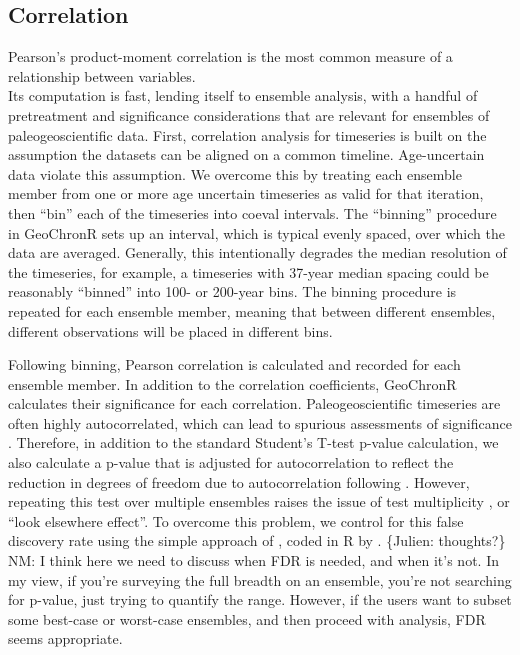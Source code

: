 \documentclass[gchron, manuscript]{copernicus}
\begin{document}
\subsection{Correlation}

Pearson's product-moment correlation is the most common measure of a relationship between variables.\\
Its computation is fast, lending itself to ensemble analysis, with a handful of pretreatment and significance considerations that are relevant for ensembles of paleogeoscientific data.
First, correlation analysis for timeseries is built on the assumption the datasets can be aligned on a common timeline.
Age-uncertain data violate this assumption.
We overcome this by treating each ensemble member from one or more age uncertain timeseries as valid for that iteration, then ``bin'' each of the timeseries into coeval intervals.
The ``binning'' procedure in GeoChronR sets up an interval, which is typical evenly spaced, over which the data are averaged.
Generally, this intentionally degrades the median resolution of the timeseries, for example, a timeseries with 37-year median spacing could be reasonably ``binned'' into 100- or 200-year bins.
The binning procedure is repeated for each ensemble member, meaning that between different ensembles, different observations will be placed in different bins.

Following binning, Pearson correlation is calculated and recorded for each ensemble member.
In addition to the correlation coefficients, GeoChronR calculates their significance for each correlation.
Paleogeoscientific timeseries are often highly autocorrelated, which can lead to spurious assessments of significance \citep{Hu_epsl17}.
Therefore, in addition to the standard Student's T-test p-value calculation, we also calculate a p-value that is adjusted for autocorrelation to reflect the reduction in degrees of freedom due to autocorrelation following \citet{bretherton1999}.
However, repeating this test over multiple ensembles raises the issue of test multiplicity \citep{Ventura2004}, or ``look elsewhere effect''.
To overcome this problem, we control for this false discovery rate using the simple approach of \citet{BenjaminiHochberg95}, coded in R by \citet{Ventura2004}.
\{Julien: thoughts?\} NM: I think here we need to discuss when FDR is needed, and when it's not. In my view, if you're surveying the full breadth on an ensemble, you're not searching for p-value, just trying to quantify the range. However, if the users want to subset some best-case or worst-case ensembles, and then proceed with analysis, FDR seems appropriate.
\end{document}
